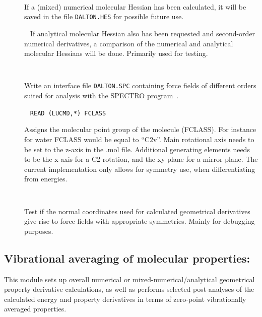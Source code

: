 \begin{description}
\item[]\verb| |\newline

If a (mixed) numerical molecular Hessian has been calculated, it will be saved
in the file \verb|DALTON.HES| for possible future use.

\item[]\verb| |\newline
If analytical molecular Hessian also has been requested and second-order
numerical derivatives, a comparison of the numerical and analytical
molecular Hessians will be done. Primarily used for testing.

\item[]\verb| |\newline

Write an interface file \verb|DALTON.SPC| containing force fields of
different orders suited for analysis with the SPECTRO
program~\cite{spectroref}.

\item[]\verb| |\newline
\verb|READ (LUCMD,*) FCLASS|

Assigns the molecular point group of the molecule (FCLASS). For
instance for water FCLASS would be equal to ``C2v''. Main rotational
axis needs to be set to the z-axis in the .mol file. Additional
generating elements needs to be the x-axis for a C2 rotation, and the
xy plane for a mirror plane. The current implementation only allows
for symmetry use, when differentiating from energies.

\item[]\verb| |\newline

Test if the normal coordinates used for calculated geometrical
derivatives give rise to force fields with appropriate
symmetries. Mainly for debugging purposes.

\end{description}

\subsection{Vibrational averaging of molecular properties: }
\label{sec:nmddrv.propan}

This module sets up overall numerical or mixed-numerical/analytical
geometrical property derivative calculations, as well as performs selected
post-analyses of the calculated energy and property derivatives in
terms of zero-point vibrationally averaged properties.

